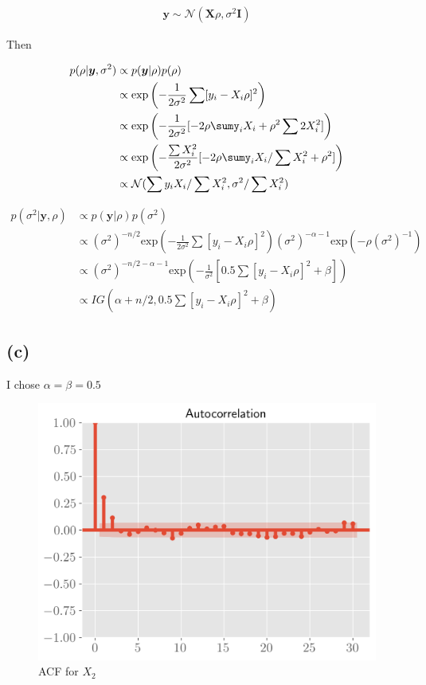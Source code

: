 \documentclass[11pt]{article}
\begin{document}
\begin{align*}
    \boldsymbol{y} \sim \mathcal{N}(\boldsymbol{X}\rho , \sigma^2\boldsymbol{I})
\end{align*}

Then

\begin{align*}
    p(\rho|\boldsymbol{y}, \sigma^2) &\propto p(\boldsymbol{y}|\rho)p(\rho)\\
    & \propto\text{exp} \left( -\frac{1}{2\sigma^2} \sum [y_i-X_i\rho]^2\right)\\
      & \propto\text{exp} \left( -\frac{1}{2\sigma^2} [-2\rho\sumy_iX_i + \rho^2\sum2X_i^2]\right)\\
      & \propto\text{exp} \left( -\frac{\sum X_i^2}{2\sigma^2} [-2\rho\sumy_iX_i/\sum X_i^2 + \rho^2]\right)\\
      & \propto \mathcal{N}(\sum y_i X_i / \sum X_i^2, \sigma^2/\sum X_i^2)
\end{align*}

\begin{align*}
    p(\sigma^2|\boldsymbol{y}, \rho) &\propto p(\boldsymbol{y}|\rho)p(\sigma^2)\\
    &  \propto (\sigma^2)^{-n/2}\text{exp} \left( -\frac{1}{2\sigma^2} \sum [y_i-X_i\rho]^2\right) (\sigma^2)^{-\alpha-1} \text{exp}(-\rho(\sigma^2)^{-1})\\
    &  \propto (\sigma^2)^{-n/2-\alpha-1}\text{exp} \left( -\frac{1}{\sigma^2} [0.5\sum [y_i-X_i\rho]^2 + \beta]\right)\\
    & \propto IG(\alpha + n/2, 0.5\sum [y_i-X_i\rho]^2 + \beta)
\end{align*}

\subsection*{(c)}
I chose $\alpha=\beta=0.5$

\begin{figure}[!h]
    \centering
    \includegraphics[scale=.6
    ]{../figures/acf2.png}
    \caption{ACF for $X_2$}
    \label{fig:my_label}
\end{figure}
\end{document}
